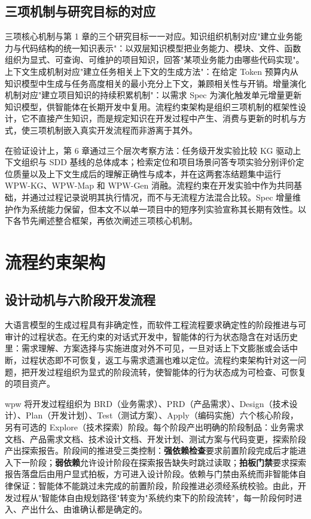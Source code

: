 \subsection{三项机制与研究目标的对应}
三项核心机制与第 1 章的三个研究目标一一对应。知识组织机制对应"建立业务能力与代码结构的统一知识表示"：以双层知识模型把业务能力、模块、文件、函数组织为显式、可查询、可维护的项目知识，回答"某项业务能力由哪些代码实现"。上下文生成机制对应"建立任务相关上下文的生成方法"：在给定 Token 预算内从知识模型中生成与任务高度相关的最小充分上下文，兼顾相关性与开销。增量演化机制对应"建立项目知识的持续积累机制"：以需求 Spec 为演化触发单元增量更新知识模型，供智能体在长期开发中复用。流程约束架构是组织三项机制的框架性设计，它不直接产生知识，而是规定知识在开发过程中产生、消费与更新的时机与方式，使三项机制嵌入真实开发流程而非游离于其外。

在验证设计上，第 6 章通过三个层次考察方法：任务级开发实验比较 KG 驱动上下文组织与 SDD 基线的总体成本；检索定位和项目场景问答专项实验分别评价定位质量以及上下文生成后的理解正确性与成本，并在这两套冻结题集中运行 WPW-KG、WPW-Map 和 WPW-Gen 消融。流程约束在开发实验中作为共同基础，并通过过程记录说明其执行情况，而不与无流程方法混合比较。Spec 增量维护作为系统能力保留，但本文不以单一项目中的短序列实验宣称其长期有效性。以下各节先阐述整合框架，再依次阐述三项核心机制。


\section{流程约束架构}

\subsection{设计动机与六阶段开发流程}
大语言模型的生成过程具有非确定性，而软件工程流程要求确定性的阶段推进与可审计的过程状态。在无约束的对话式开发中，智能体的行为状态隐含在对话历史里：需求理解、方案选择与实施进度对外不可见，一旦对话上下文膨胀或会话中断，过程状态即不可恢复，返工与需求遗漏也难以定位。流程约束架构针对这一问题，把开发过程组织为显式的阶段流转，使智能体的行为状态成为可检查、可恢复的项目资产。

wpw 将开发过程组织为 BRD（业务需求）、PRD（产品需求）、Design（技术设计）、Plan（开发计划）、Test（测试方案）、Apply（编码实施）六个核心阶段，另有可选的 Explore（技术探索）阶段。每个阶段产出明确的阶段制品：业务需求文档、产品需求文档、技术设计文档、开发计划、测试方案与代码变更，探索阶段产出探索报告。阶段间的推进受三类控制：\textbf{强依赖检查}要求前置阶段完成后才能进入下一阶段；\textbf{弱依赖}允许设计阶段在探索报告缺失时跳过读取；\textbf{拍板门禁}要求探索报告落盘后由用户显式拍板，方可进入设计阶段。依赖与门禁由系统而非智能体自律保证：智能体不能跳过未完成的前置阶段，阶段推进必须经系统校验。由此，开发过程从"智能体自由规划路径"转变为"系统约束下的阶段流转"，每一阶段何时进入、产出什么、由谁确认都是确定的。


